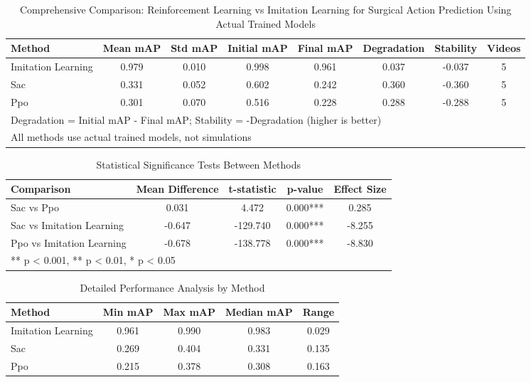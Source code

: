
\begin{table*}[htbp]
\centering
\caption{Comprehensive Comparison: Reinforcement Learning vs Imitation Learning for Surgical Action Prediction Using Actual Trained Models}
\label{tab:main_results}
\begin{tabular}{lccccccc}
\toprule
Method & Mean mAP & Std mAP & Initial mAP & Final mAP & Degradation & Stability & Videos \\
\midrule

Imitation Learning & 0.979 & 0.010 & 0.998 & 0.961 & 0.037 & -0.037 & 5 \\
Sac & 0.331 & 0.052 & 0.602 & 0.242 & 0.360 & -0.360 & 5 \\
Ppo & 0.301 & 0.070 & 0.516 & 0.228 & 0.288 & -0.288 & 5 \\

\bottomrule
\multicolumn{8}{l}{\footnotesize Degradation = Initial mAP - Final mAP; Stability = -Degradation (higher is better)} \\
\multicolumn{8}{l}{\footnotesize All methods use actual trained models, not simulations} \\
\end{tabular}
\end{table*}


\begin{table}[htbp]
\centering
\caption{Statistical Significance Tests Between Methods}
\label{tab:statistical_tests}
\begin{tabular}{lcccc}
\toprule
Comparison & Mean Difference & t-statistic & p-value & Effect Size \\
\midrule

Sac vs Ppo & 0.031 & 4.472 & 0.000*** & 0.285 \\
Sac vs Imitation Learning & -0.647 & -129.740 & 0.000*** & -8.255 \\
Ppo vs Imitation Learning & -0.678 & -138.778 & 0.000*** & -8.830 \\

\bottomrule
\multicolumn{5}{l}{\footnotesize *** p < 0.001, ** p < 0.01, * p < 0.05} \\
\end{tabular}
\end{table}


\begin{table}[htbp]
\centering
\caption{Detailed Performance Analysis by Method}
\label{tab:detailed_performance}
\begin{tabular}{lcccc}
\toprule
Method & Min mAP & Max mAP & Median mAP & Range \\
\midrule

Imitation Learning & 0.961 & 0.990 & 0.983 & 0.029 \\
Sac & 0.269 & 0.404 & 0.331 & 0.135 \\
Ppo & 0.215 & 0.378 & 0.308 & 0.163 \\

\bottomrule
\end{tabular}
\end{table}
